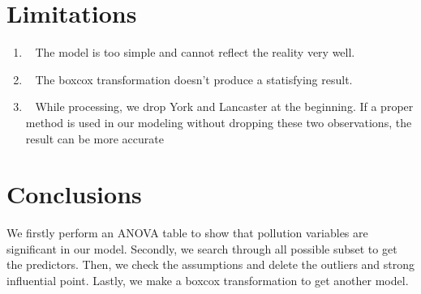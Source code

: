 \documentclass[12pt,a4paper]{article}
\begin{document}
\section{Limitations}
\begin{enumerate}
\item{}~{}
The model is too simple and cannot reflect the reality very well. 
\item{}~{}
The boxcox transformation doesn't produce a statisfying result.
\item{}~{}
While processing, we drop York and Lancaster at the beginning. If a proper method is used in our modeling without dropping these two observations, the result can be more accurate
\end{enumerate}
\section{Conclusions}
We firstly perform an ANOVA table to show that pollution variables are significant in our model. Secondly, we search through all possible subset to get the predictors. Then, we check the assumptions and delete the outliers and strong influential point. Lastly, we make a boxcox transformation to get another model.
\newpage
\appendix
\end{document}
